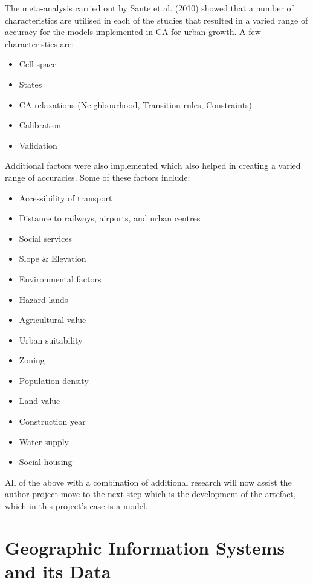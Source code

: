 The meta-analysis carried out by Sante et al. (2010) showed that a number of characteristics are utilised in each of the studies that resulted in a varied range of accuracy for the models implemented in CA for urban growth\citep{ca1}.
A few characteristics are:
\begin{itemize}
\item Cell space
\item States
\item CA relaxations (Neighbourhood, Transition rules, Constraints)
\item Calibration
\item Validation
\end{itemize}
Additional factors were also implemented which also helped in creating a
varied range of accuracies. Some of these factors include:
\begin{multicols}{2}
\begin{itemize}
\item Accessibility of transport
\item Distance to railways, airports, and urban centres
\item Social services
\item Slope \& Elevation
\item Environmental factors
\item Hazard lands
\item Agricultural value
\item Urban suitability
\item Zoning
\item Population density
\item Land value
\item Construction year
\item Water supply
\item Social housing
\end{itemize}
\end{multicols}
All of the above with a combination of additional research will now assist the
author project move to the next step which is the development of the artefact, which
in this project's case is a model.
\section{Geographic Information Systems and its Data}

